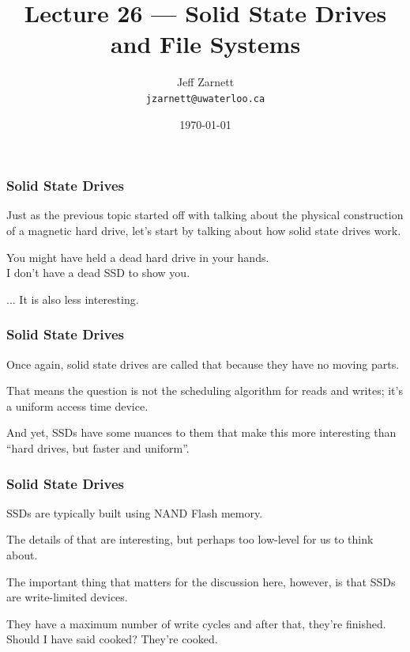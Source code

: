 

\title{Lecture 26 --- Solid State Drives and File Systems}

\author{Jeff Zarnett \\ \small \texttt{jzarnett@uwaterloo.ca}}
\date{\today}




\begin{frame}
  \titlepage
\end{frame}


\begin{frame}
\frametitle{Solid State Drives}

Just as the previous topic started off with talking about the physical construction of a magnetic hard drive, let's start by talking about how solid state drives work. 

You might have held a dead hard drive in your hands.\\
\quad I don't have a dead SSD to show you.

... It is also less interesting.

\end{frame}


\begin{frame}
\frametitle{Solid State Drives}

Once again, solid state drives are called that because they have no moving parts. 

That means the question is not the scheduling algorithm for reads and writes; it's a uniform access time device.

And yet, SSDs have some nuances to them that make this more interesting than ``hard drives, but faster and uniform''. 

\end{frame}


\begin{frame}
\frametitle{Solid State Drives}


SSDs are typically built using NAND Flash memory. 

The details of that are interesting, but perhaps too low-level for us to think about. 

The important thing that matters for the discussion here, however, is that SSDs are write-limited devices. 

They have a maximum number of write cycles and after that, they're finished.\\
\quad Should I have said cooked? They're cooked.

\end{frame}


